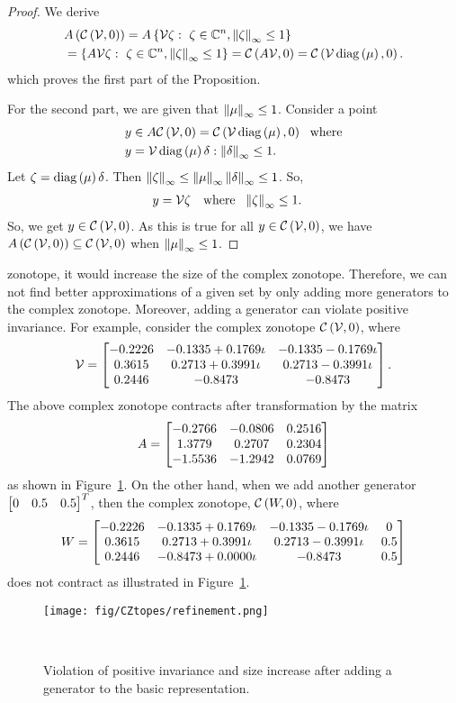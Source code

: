 % 
\begin{proof}
We derive
\begin{align*}
& A\left(\mathit{\mathcal{C}}\left(\mathcal{V},0\right)\right) =
A\left\{\mathcal{V}\zeta:~\zeta\in\mathbb{C}^n,\left\|\zeta\right\|_{\infty}\leq 1\right\}\\
& =\left\{A\mathcal{V}\zeta:~\zeta\in\mathbb{C}^n,\left\|\zeta\right\|_{\infty}\leq 1\right\}
= \mathit{\mathcal{C}}\left(A\mathcal{V},0\right)=\mathit{\mathcal{C}}\left(\mathcal{V}\operatorname{diag}\left(\mu\right),0\right).
\end{align*}
%
which proves the first part of the
Proposition.

For the second part, we are given that $\left\|\mu\right\|_{\infty}\leq 1$.
Consider a point
%
\begin{align*}
  & y\in A\mathit{\mathcal{C}}\left(\mathcal{V},0\right)=\mathit{\mathcal{C}}\left(\mathcal{V}\operatorname{diag}\left(\mu\right),0\right)~~\text{where}\\
  &y = \mathcal{V}\operatorname{diag}\left(\mu\right)\delta:\left\|\delta\right\|_{\infty}\leq
1.
\end{align*}
%
Let $\zeta = \operatorname{diag}\left(\mu\right)\delta$. Then $\left\|\zeta\right\|_{\infty} \leq
\left\|\mu\right\|_{\infty}\left\|\delta\right\|_{\infty} \leq 1$.  So,
%
\begin{align*}
  & y=\mathcal{V}\zeta~~\text{ where }~
  \left\|\zeta\right\|_{\infty}\leq 1.
\end{align*}
%
So, we get $y\in \mathit{\mathcal{C}}\left(\mathcal{V},0\right)$.  As this is true for all
$y\in\mathit{\mathcal{C}}\left(\mathcal{V},0\right)$, we have
$A\left(\mathit{\mathcal{C}}\left(\mathcal{V},0\right)\right)\subseteq
\mathit{\mathcal{C}}\left(\mathcal{V},0\right)$ when $\left\|\mu\right\|_{\infty}\leq 1$.
\end{proof}
zonotope, it would increase the size of the complex zonotope.
Therefore, we can not find better approximations of a given set by
only adding more generators to the complex zonotope.  Moreover, adding
a generator can violate positive invariance.  For example, consider
the complex zonotope $\mathit{\mathcal{C}}\left(\mathcal{V},0\right)$, where
%
\[
\mathcal{V} = \left[\begin{matrix}-0.2226 &  -0.1335 + 0.1769\iota &   -0.1335 - 0.1769\iota\\
   0.3615  &   0.2713 + 0.3991\iota &   0.2713 - 0.3991\iota\\
   0.2446  &   -0.8473 &  -0.8473\end{matrix}\right].
\]
%
The above complex zonotope contracts after transformation by the matrix
%
\[
A = \left[\begin{matrix}-0.2766 &   -0.0806 &    0.2516\\
    1.3779  &  0.2707  &   0.2304\\
   -1.5536 &  -1.2942 &    0.0769\end{matrix}\right]
\]
%
as shown in Figure~\ref{fig:refinement}.  On the other hand, when we
add another generator $\left[\begin{matrix}0 & 0.5 & 0.5\end{matrix}\right]^T$, then the complex
zonotope, $\mathit{\mathcal{C}}\left(W,0\right)$, where
%
\[
W=\left[\begin{matrix}-0.2226 &  -0.1335 + 0.1769\iota &   -0.1335 -
   0.1769\iota & 0\\
   0.3615 &   0.2713 + 0.3991\iota &   0.2713 -
   0.3991\iota & 0.5\\
   0.2446 &   -0.8473 + 0.0000\iota &  -0.8473 & 0.5\end{matrix}\right]
\]
%
does not contract as illustrated in Figure~\ref{fig:refinement}.
%
\begin{figure}
\center
\texttt{[image: fig/CZtopes/refinement.png]}
\caption{Violation of positive invariance and size increase after
adding a generator to the basic representation.}~\label{fig:refinement}
\end{figure}

